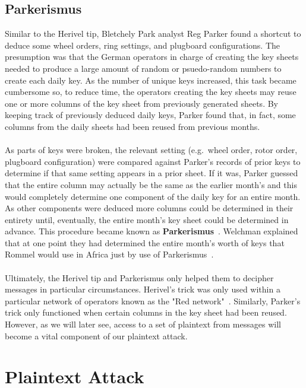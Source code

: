 \subsection{Parkerismus}
Similar to the Herivel tip, Bletchely Park analyst Reg Parker found a
shortcut to deduce some wheel orders, ring settings, and plugboard
configurations. The presumption was that the German operators in
charge of creating the key sheets needed to produce a large amount of
random or psuedo-random numbers to create each daily key. As the
number of unique keys increased, this task became cumbersome so, to
reduce time, the operators creating the key sheets may reuse one or
more columns of the key sheet from previously generated sheets. By
keeping track of previously deduced daily keys, Parker found that, in
fact, some columns from the daily sheets had been reused from
previous months.
\\\\As parts of keys were broken, the relevant setting
(e.g.\ wheel order, rotor order, plugboard configuration) were compared
against Parker's records of prior keys to determine if that same
setting appears in a prior sheet. If it was, Parker guessed that the
entire column may actually be the same as the earlier month's and
this would completely determine one component of the daily key for an
entire month. As other components were deduced more columns could be
determined in their entirety until, eventually, the entire month's
key sheet could be determined in advance. This procedure became known
as {\bf{Parkerismus}}~\cite[pp.~130--131]{Welchman1982HutSix}. Welchman explained that at one point they had
determined the entire month's worth of keys that Rommel would use in
Africa just by use of Parkerismus~\cite[p.~131]{Welchman1982HutSix}.
\\\\Ultimately, the Herivel tip and Parkerismus only helped them to
decipher messages in particular circumstances. Herivel's trick was
only used within a
particular network of operators known as the "Red network"~\cite[p.~101]{Welchman1982HutSix}. Similarly,
Parker's trick only functioned when certain columns in the key sheet
had been reused. However,
as we will later see, access to a set of plaintext from messages will
become a vital component of our plaintext attack.

\section{Plaintext Attack}

